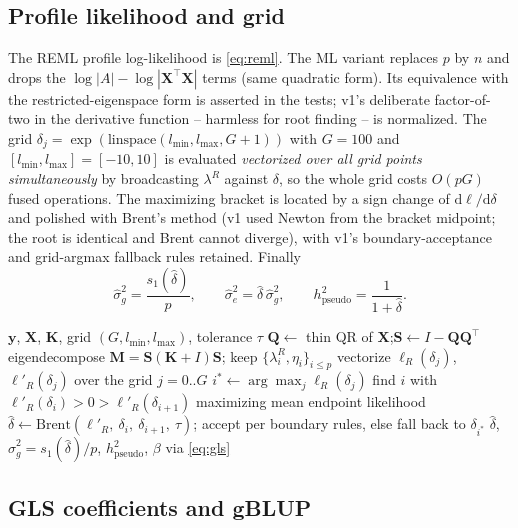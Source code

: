 \documentclass[11pt]{article}
\newcommand{\y}{\mathbf{y}}
\newcommand{\K}{\mathbf{K}}
\newcommand{\Mm}{\mathbf{M}}
\newcommand{\X}{\mathbf{X}}
\newcommand{\Q}{\mathbf{Q}}
\newcommand{\Sm}{\mathbf{S}}
\begin{document}
\subsection{Profile likelihood and grid}

The REML profile log-likelihood is \eqref{eq:reml}. The ML variant
replaces $p$ by $n$ and drops the $\log|A| - \log|\X^\top\X|$ terms (same
quadratic form). Its equivalence with the restricted-eigenspace form is
asserted in the tests; v1's deliberate factor-of-two in the derivative function --
harmless for root finding -- is normalized. The grid
$\delta_j = \exp(\mathrm{linspace}(l_{\min}, l_{\max}, G{+}1))$ with
$G = 100$ and $[l_{\min},l_{\max}] = [-10, 10]$ is evaluated
\emph{vectorized over all grid points simultaneously} by broadcasting
$\lambda^R$ against $\delta$, so the whole grid costs $O(pG)$ fused
operations. The maximizing bracket is located by a sign change of
$\mathrm{d}\ell/\mathrm{d}\delta$ and polished with Brent's method
(v1 used Newton from the bracket midpoint; the root is identical and
Brent cannot diverge), with v1's boundary-acceptance and
grid-argmax fallback rules retained. Finally
\begin{equation}
  \hat\sigma_g^2 = \frac{s_1(\hat\delta)}{p}, \qquad
  \hat\sigma_e^2 = \hat\delta\,\hat\sigma_g^2, \qquad
  h^2_{\text{pseudo}} = \frac{1}{1+\hat\delta}.
\end{equation}

\begin{algorithm}[t]
\caption{EMMA exact fit (REML shown; ML analogous)}
\label{alg:emma}
\begin{algorithmic}[1]
\Require $\y$, $\X$, $\K$, grid $(G, l_{\min}, l_{\max})$, tolerance $\tau$
\State $\Q \gets$ thin QR of $\X$;\quad $\Sm \gets I - \Q\Q^\top$
\State eigendecompose $\Mm = \Sm(\K + I)\Sm$; keep $\{\lambda^R_i, \eta_i\}_{i\le p}$
\State vectorize $\ell_R(\delta_j)$, $\ell'_R(\delta_j)$ over the grid $j=0..G$
\State $i^\ast \gets \arg\max_j \ell_R(\delta_j)$
\State find $i$ with $\ell'_R(\delta_{i}) > 0 > \ell'_R(\delta_{i+1})$ maximizing mean endpoint likelihood
\State $\hat\delta \gets \mathrm{Brent}(\ell'_R,\ \delta_i,\ \delta_{i+1},\ \tau)$; accept per boundary rules, else fall back to $\delta_{i^\ast}$
\State \Return $\hat\delta$, $\hat\sigma_g^2 = s_1(\hat\delta)/p$, $h^2_{\text{pseudo}}$, $\beta$ via \eqref{eq:gls}
\end{algorithmic}
\end{algorithm}

\subsection{GLS coefficients and gBLUP}
\end{document}
